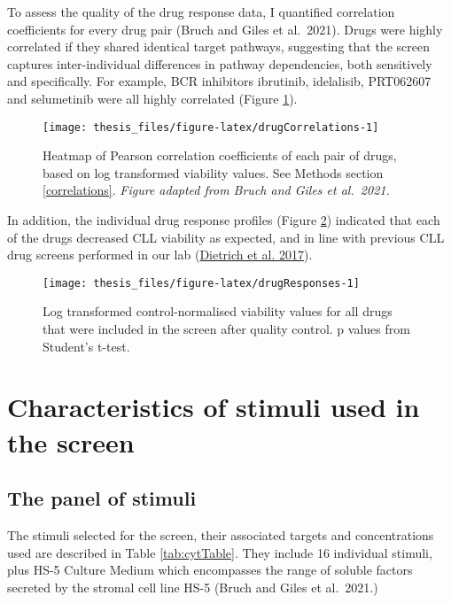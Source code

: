 \documentclass[11pt, a4paper, twosided]{book}
\begin{document}
To assess the quality of the drug response data, I quantified correlation coefficients for every drug pair (Bruch and Giles et al.~2021). Drugs were highly correlated if they shared identical target pathways, suggesting that the screen captures inter-individual differences in pathway dependencies, both sensitively and specifically. For example, BCR inhibitors ibrutinib, idelalisib, PRT062607 and selumetinib were all highly correlated (Figure \ref{fig:drugCorrelations}).


\begin{figure}

{\centering \texttt{[image: thesis\_files/figure-latex/drugCorrelations-1]} 

}

\caption{Heatmap of Pearson correlation coefficients of each pair of drugs, based on log transformed viability values. See Methods section \ref{correlations}. \emph{Figure adapted from Bruch and Giles et al.~2021.}}\label{fig:drugCorrelations}
\end{figure}
In addition, the individual drug response profiles (Figure \ref{fig:drugResponses}) indicated that each of the drugs decreased CLL viability as expected, and in line with previous CLL drug screens performed in our lab (\protect\hyperlink{ref-JCIpaper}{Dietrich et al. 2017}).


\begin{figure}

{\centering \texttt{[image: thesis\_files/figure-latex/drugResponses-1]} 

}

\caption{Log transformed control-normalised viability values for all drugs that were included in the screen after quality control. p values from Student's t-test.}\label{fig:drugResponses}
\end{figure}
\hypertarget{stimuli}{%
\section{Characteristics of stimuli used in the screen}\label{stimuli}}

\hypertarget{stimuli-info}{%
\subsection{The panel of stimuli}\label{stimuli-info}}

The stimuli selected for the screen, their associated targets and concentrations used are described in Table \ref{tab:cytTable}. They include 16 individual stimuli, plus HS-5 Culture Medium which encompasses the range of soluble factors secreted by the stromal cell line HS-5 (Bruch and Giles et al.~2021.)
\end{document}

